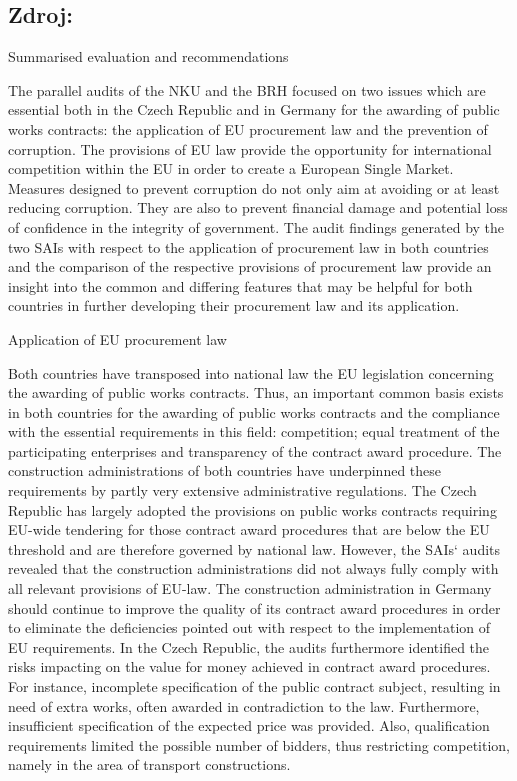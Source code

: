 \documentclass[10pt]{article}
\begin{document}
\subsection*{Zdroj:}



Summarised evaluation and recommendations

The parallel audits of the NKU and the BRH focused on two issues which are essential both in the Czech Republic and in Germany for the awarding of public works contracts: the application of EU procurement law and the prevention of corruption.
The provisions of EU law provide the opportunity for international competition within the EU in order to create a European Single Market.
Measures designed to prevent corruption do not only aim at avoiding or at least reducing corruption. They are also to prevent financial damage and potential loss of confidence in the integrity of government.
The audit findings generated by the two SAIs with respect to the application of procurement law in both countries and the comparison of the respective provisions of procurement law provide an insight into the common and differing features that may be helpful for both countries in further developing their procurement law and its application.


Application of EU procurement law

Both countries have transposed into national law the EU legislation concerning the awarding of public works contracts.
Thus, an important common basis exists in both countries for the awarding of public works contracts and the compliance with the essential requirements in this field: competition; equal treatment of the participating enterprises and transparency of the contract award procedure.
The construction administrations of both countries have underpinned these requirements by partly very extensive administrative regulations.
The Czech Republic has largely adopted the provisions on public works contracts requiring EU-wide tendering for those contract award procedures that are below the EU threshold and are therefore governed by national law.
However, the SAIs‘ audits revealed that the construction administrations did not always fully comply with all relevant provisions of EU-law.
The construction administration in Germany should continue to improve the quality of its contract award procedures in order to eliminate the deficiencies pointed out with respect to the implementation of EU requirements.
In the Czech Republic, the audits furthermore identified the risks impacting on the value for money achieved in contract award procedures.
For instance, incomplete specification of the public contract subject, resulting in need of extra works, often awarded in contradiction to the law. Furthermore, insufficient specification of the expected price was provided. Also, qualification requirements limited the possible number of bidders, thus restricting competition, namely in the area of transport constructions.
\end{document}
